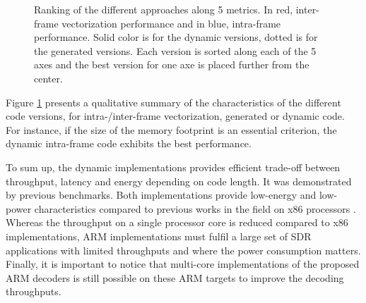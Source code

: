 \begin{figure}
  \centering
  \caption{\label{fig:spider}Ranking of the different approaches along 5
    metrics. In red, inter-frame vectorization performance and in blue,
    intra-frame performance. Solid color is for the dynamic versions, dotted is
    for the generated versions. Each version is sorted along each of the 5 axes
    and the best version for one axe is placed further from the center.}
\end{figure}

Figure \ref{fig:spider} presents a qualitative summary of the
characteristics of the different code versions, for intra-/inter-frame
vectorization, generated or dynamic code. For instance, if the size of
the memory footprint is an essential criterion, the dynamic intra-frame
code exhibits the best performance.

To sum up, the dynamic implementations provides efficient trade-off between
throughput, latency and energy depending on code length. It was demonstrated by
previous benchmarks. Both implementations provide low-energy and low-power
characteristics compared to previous works in the field on x86 processors
\cite{Sarkis2014,Giard2014,Sarkis2014a,LeGal2014,LeGal2015a,Cassagne2015c}.
Whereas the throughput on a single processor core is reduced compared to x86
implementations, ARM implementations must fulfil a large set of SDR applications
with limited throughputs and where the power consumption matters. Finally, it is
important to notice that multi-core implementations of the proposed ARM decoders
is still possible on these ARM targets to improve the decoding throughputs.


